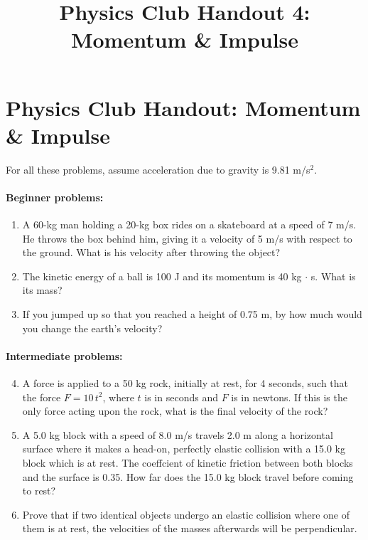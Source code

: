 \documentclass[12pt,letterpaper]{article}
\title{Physics Club Handout 4: Momentum & Impulse}
\begin{document}
\section{Physics Club Handout: Momentum \& Impulse}
For all these problems, assume acceleration due to gravity is 9.81 m\slash s$^2$.
\\

\paragraph{Beginner problems:}
\begin{enumerate}
\item
A 60-kg man holding a 20-kg box rides on a skateboard at a speed of 7 m/s. He throws the box behind him, giving it a velocity of 5 m/s with respect to the ground. What is his velocity after throwing the object?

\item
The kinetic energy of a ball is 100 J and its momentum is 40 kg$\,\cdot\,$s. What is its mass?

\item
If you jumped up so that you reached a height of 0.75 m, by how much would you change the earth's velocity?
\end{enumerate}
\paragraph{Intermediate problems:}
\begin{enumerate}
\setcounter{enumi}{3}
\item
A force is applied to a 50 kg rock, initially at rest, for 4 seconds, such that the force $F = 10\,t^2$, where $t$ is in seconds and $F$ is in newtons. If this is the only force acting upon the rock, what is the final velocity of the rock?

\item
A 5.0 kg block with a speed of 8.0 m/s travels 2.0 m along a horizontal surface where it makes a head-on, perfectly elastic collision with a 15.0 kg block which is at rest. The coeffcient of kinetic friction between both blocks and the surface is 0.35. How far does the 15.0 kg block travel before coming to rest?

\item
Prove that if two identical objects undergo an elastic collision where one of them is at rest, the velocities of the masses afterwards will be perpendicular.
\end{enumerate}
\end{document}
